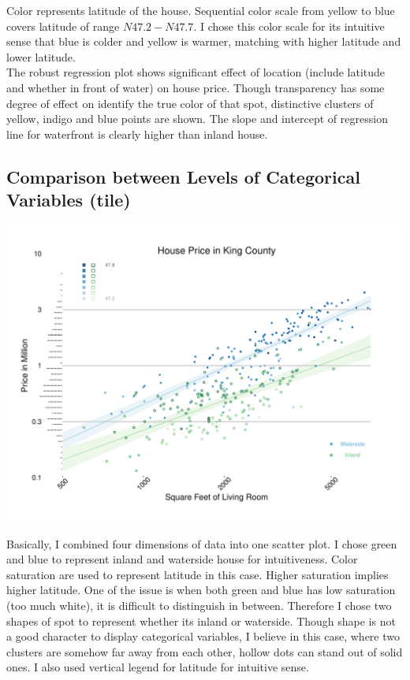 \documentclass[11pt,letterpaper]{article}
\begin{document}
\noindent Color represents latitude of the house. Sequential color scale from yellow to blue covers latitude of range $N 47.2 - N 47.7$. I chose this color scale for its intuitive sense that blue is colder and yellow is warmer, matching with higher latitude and lower latitude. \\

\noindent The robust regression plot shows significant effect of location (include latitude and whether in front of water) on house price. Though transparency has some degree of effect on identify the true color of that spot, distinctive clusters of yellow, indigo and blue points are shown. The slope and intercept of regression line for waterfront is clearly higher than inland house. 

\subsection*{Comparison between Levels of  Categorical Variables (tile)}

\includegraphics[scale=0.8]{HW2-4.pdf}

\noindent Basically, I combined four dimensions of data into one scatter plot. I chose green and blue to represent inland and waterside house for intuitiveness. Color saturation are used to represent latitude in this case. Higher saturation implies higher latitude. One of the issue is when both green and blue has low saturation (too much white), it is difficult to distinguish in between. Therefore I chose two shapes of spot to represent whether its inland or waterside. Though shape is not a good character to display categorical variables, I believe in this case, where two clusters are somehow far away from each other, hollow dots can stand out of solid ones. I also used vertical legend for latitude for intuitive sense. 
\end{document}
